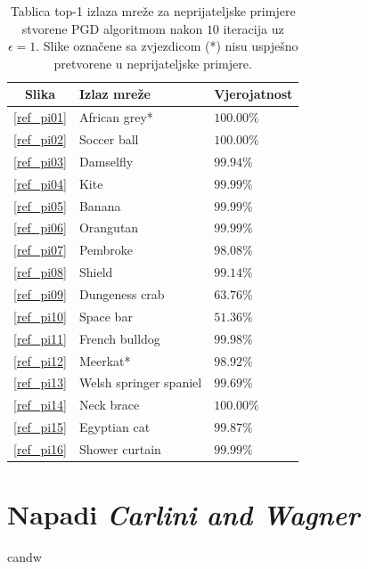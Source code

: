 \documentclass[utf8, diplomski]{fer}
\begin{document}
\begin{table}[H]
\centering
\begin{tabular}{@{}cll@{}}
\toprule
Slika & Izlaz mreže & Vjerojatnost \\ \midrule
\ref{ref_pi01} & African grey* & $100.00\%$\\
\ref{ref_pi02} & Soccer ball & $100.00\%$ \\ 
\ref{ref_pi03} & Damselfly & $99.94\%$ \\ 
\ref{ref_pi04} & Kite & $99.99\%$ \\  
\ref{ref_pi05} & Banana & $99.99\%$ \\ 
\ref{ref_pi06} & Orangutan & $99.99\%$ \\ 
\ref{ref_pi07} & Pembroke & $98.08\%$ \\ 
\ref{ref_pi08} & Shield & $99.14\%$ \\ 
\ref{ref_pi09} & Dungeness crab & $63.76\%$ \\ 
\ref{ref_pi10} & Space bar & $51.36\%$ \\ 
\ref{ref_pi11} & French bulldog & $99.98\%$ \\ 
\ref{ref_pi12} & Meerkat* & $98.92\%$ \\ 
\ref{ref_pi13} & Welsh springer spaniel & $99.69\%$ \\ 
\ref{ref_pi14} & Neck brace & $100.00\%$ \\ 
\ref{ref_pi15} & Egyptian cat & $99.87\%$ \\ 
\ref{ref_pi16} & Shower curtain & $99.99\%$ \\ \bottomrule
\end{tabular}
\caption{Tablica top-1 izlaza mreže za neprijateljske primjere stvorene PGD algoritmom nakon $10$ iteracija uz $\epsilon = 1$. Slike označene sa zvjezdicom (*) nisu uspješno pretvorene u neprijateljske primjere.}\label{pgd_predictions}
\end{table}

\section{Napadi \textit{Carlini and Wagner}} candw\citep{Carlini2017TowardsET}
\end{document}
